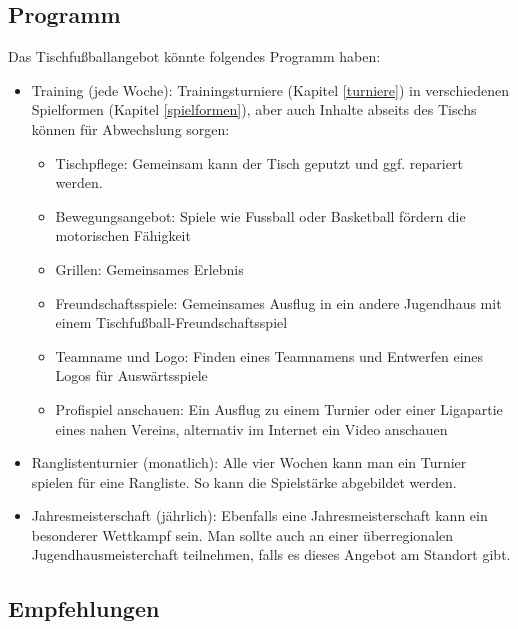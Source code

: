 \subsection{Programm}
\label{jugend:standorte:programm}

Das Tischfußballangebot könnte folgendes Programm haben: 
\begin{itemize}
\item Training (jede Woche): Trainingsturniere (Kapitel \ref{turniere}) in verschiedenen Spielformen (Kapitel \ref{spielformen}), aber auch Inhalte abseits des Tischs können für Abwechslung sorgen:

\begin{itemize}
\item Tischpflege: Gemeinsam kann der Tisch geputzt und ggf. repariert werden.  
\item Bewegungsangebot: Spiele wie Fussball oder Basketball fördern die motorischen Fähigkeit
\item Grillen: Gemeinsames Erlebnis 
\item Freundschaftsspiele: Gemeinsames Ausflug in ein andere Jugendhaus mit einem Tischfußball-Freundschaftsspiel
\item Teamname und Logo: Finden eines Teamnamens und Entwerfen eines Logos für Auswärtsspiele   
\item Profispiel anschauen: Ein Ausflug zu einem Turnier oder einer Ligapartie eines nahen Vereins, alternativ im Internet ein Video anschauen 
\end{itemize} 
  
\item Ranglistenturnier (monatlich): Alle vier Wochen kann man ein Turnier spielen für eine Rangliste. So kann die Spielstärke abgebildet werden.  
\item Jahresmeisterschaft (jährlich): Ebenfalls eine Jahresmeisterschaft kann ein besonderer Wettkampf sein. Man sollte auch an einer überregionalen Jugendhausmeisterchaft teilnehmen, falls es dieses Angebot am Standort gibt. 
\end{itemize}  

\subsection{Empfehlungen}
\label{jugend:standorte:empfehlungen}

